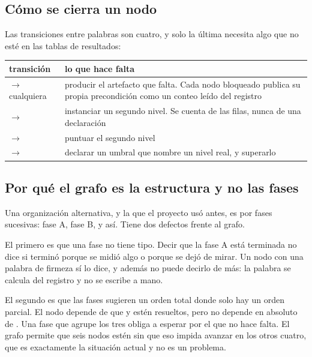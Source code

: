 \subsection{Cómo se cierra un nodo}

Las transiciones entre palabras son cuatro, y solo la última necesita algo que no
esté en las tablas de resultados:

\begin{center}
\begin{tabularx}{\linewidth}{@{}L{4.6cm} X@{}}
\toprule
transición & lo que hace falta\\
\midrule
{} $\rightarrow$ cualquiera & producir el artefacto que falta. Cada nodo bloqueado publica su propia precondición como un conteo leído del registro\\
 $\rightarrow$  & instanciar un segundo nivel. Se cuenta de las filas, nunca de una declaración\\
 $\rightarrow$  & puntuar el segundo nivel\\
 $\rightarrow$  & declarar un umbral que nombre un nivel real, y superarlo\\
\bottomrule
\end{tabularx}
\end{center}

\subsection{Por qué el grafo es la estructura y no las fases}

Una organización alternativa, y la que el proyecto usó antes, es por fases
sucesivas: fase A, fase B, y así. Tiene dos defectos frente al grafo.

El primero es que una fase no tiene tipo. Decir que la fase A está terminada no
dice si terminó porque se midió algo o porque se dejó de mirar. Un nodo con una
palabra de firmeza sí lo dice, y además no puede decirlo de más: la palabra se
calcula del registro y no se escribe a mano.

El segundo es que las fases sugieren un orden total donde solo hay un orden
parcial. El nodo  depende de que  y 
estén resueltos, pero no depende en absoluto de . Una fase que
agrupe los tres obliga a esperar por el que no hace falta. El grafo permite que
seis nodos estén  sin que eso impida avanzar en los otros cuatro,
que es exactamente la situación actual y no es un problema.
